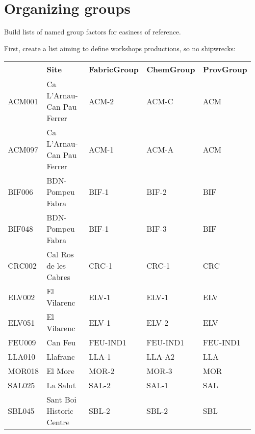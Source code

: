 \documentclass[12pt,]{book}
\newenvironment{Shaded}{\begin{snugshade}}{\end{snugshade}}
\newcommand{\DataTypeTok}[1]{\textcolor[rgb]{0.13,0.29,0.53}{#1}}
\newcommand{\KeywordTok}[1]{\textcolor[rgb]{0.13,0.29,0.53}{\textbf{#1}}}
\newcommand{\NormalTok}[1]{#1}
\newcommand{\OperatorTok}[1]{\textcolor[rgb]{0.81,0.36,0.00}{\textbf{#1}}}
\newcommand{\StringTok}[1]{\textcolor[rgb]{0.31,0.60,0.02}{#1}}
\begin{document}
\hypertarget{organizing-groups}{%
\section{Organizing groups}\label{organizing-groups}}

Build lists of named group factors for easiness of reference.

First, create a list aiming to define workshops productions, so no shipwrecks:

\begin{Shaded}
\end{Shaded}

\begin{tabular}{l|l|l|l|l}
\hline
  & Site & FabricGroup & ChemGroup & ProvGroup\\
\hline
ACM001 & Ca L'Arnau-Can Pau Ferrer & ACM-2 & ACM-C & ACM\\
\hline
ACM097 & Ca L'Arnau-Can Pau Ferrer & ACM-1 & ACM-A & ACM\\
\hline
BIF006 & BDN-Pompeu Fabra & BIF-1 & BIF-2 & BIF\\
\hline
BIF048 & BDN-Pompeu Fabra & BIF-1 & BIF-3 & BIF\\
\hline
CRC002 & Cal Ros de les Cabres & CRC-1 & CRC-1 & CRC\\
\hline
ELV002 & El Vilarenc & ELV-1 & ELV-1 & ELV\\
\hline
ELV051 & El Vilarenc & ELV-1 & ELV-2 & ELV\\
\hline
FEU009 & Can Feu & FEU-IND1 & FEU-IND1 & FEU-IND1\\
\hline
LLA010 & Llafranc & LLA-1 & LLA-A2 & LLA\\
\hline
MOR018 & El More & MOR-2 & MOR-3 & MOR\\
\hline
SAL025 & La Salut & SAL-2 & SAL-1 & SAL\\
\hline
SBL045 & Sant Boi Historic Centre & SBL-2 & SBL-2 & SBL\\
\hline
\end{tabular}
\end{document}
